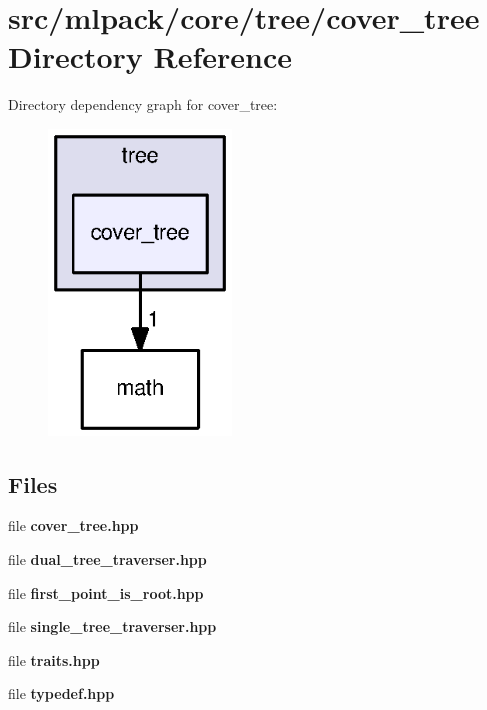 \section{src/mlpack/core/tree/cover\+\_\+tree Directory Reference}
\label{dir_8909127a93079ea6b332007d78eda270}
Directory dependency graph for cover\+\_\+tree\+:
\nopagebreak
\begin{figure}[H]
\begin{center}
\leavevmode
\includegraphics[width=138pt]{dir_8909127a93079ea6b332007d78eda270_dep}
\end{center}
\end{figure}
\subsection*{Files}
\begin{DoxyCompactItemize}
\item 
file {\bf cover\+\_\+tree.\+hpp}
\item 
file {\bf dual\+\_\+tree\+\_\+traverser.\+hpp}
\item 
file {\bf first\+\_\+point\+\_\+is\+\_\+root.\+hpp}
\item 
file {\bf single\+\_\+tree\+\_\+traverser.\+hpp}
\item 
file {\bf traits.\+hpp}
\item 
file {\bf typedef.\+hpp}
\end{DoxyCompactItemize}
